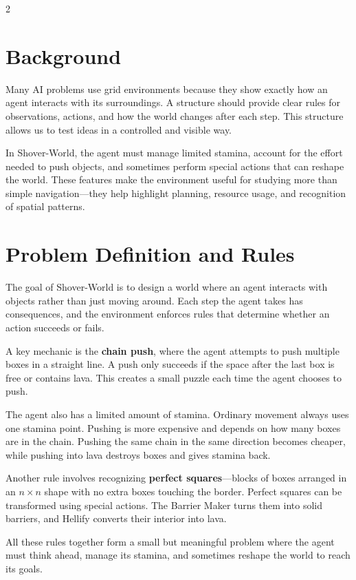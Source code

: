 \documentclass[a4paper]{article}
\begin{document}
\begin{multicols}{2}


\section{Background}

Many AI problems use grid environments because they show exactly how an agent interacts with its surroundings. A structure should provide clear rules for observations, actions, and how the world changes after each step. This structure allows us to test ideas in a controlled and visible way.

In Shover-World, the agent must manage limited stamina, account for the effort needed to push objects, and sometimes perform special actions that can reshape the world. These features make the environment useful for studying more than simple navigation—they help highlight planning, resource usage, and recognition of spatial patterns.


\section{Problem Definition and Rules}

The goal of Shover-World is to design a world where an agent interacts with objects rather than just moving around. Each step the agent takes has consequences, and the environment enforces rules that determine whether an action succeeds or fails.

A key mechanic is the \textbf{chain push}, where the agent attempts to push multiple boxes in a straight line. A push only succeeds if the space after the last box is free or contains lava. This creates a small puzzle each time the agent chooses to push.

The agent also has a limited amount of stamina. Ordinary movement always uses one stamina point. Pushing is more expensive and depends on how many boxes are in the chain. Pushing the same chain in the same direction becomes cheaper, while pushing into lava destroys boxes and gives stamina back.

Another rule involves recognizing \textbf{perfect squares}—blocks of boxes arranged in an \(n \times n\) shape with no extra boxes touching the border. Perfect squares can be transformed using special actions. The Barrier Maker turns them into solid barriers, and Hellify converts their interior into lava.

All these rules together form a small but meaningful problem where the agent must think ahead, manage its stamina, and sometimes reshape the world to reach its goals.





\end{multicols}
\end{document}
